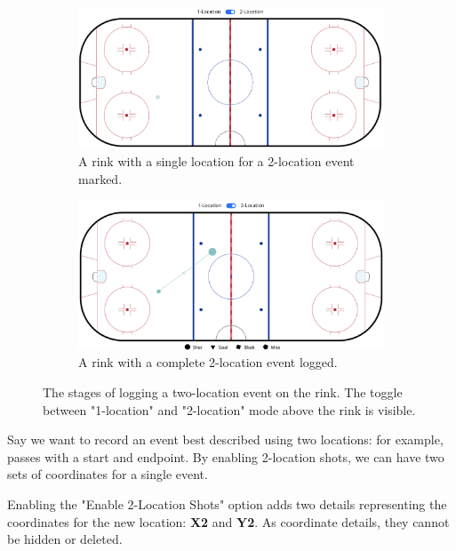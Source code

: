 \documentclass[letterpaper]{article}
\begin{document}
\begin{figure}[h]
		\begin{subfigure}{.5\textwidth}
	\centering
	\includegraphics[width=1\linewidth]{images/ghost-dot}
	\caption{A rink with a single location for a 2-location event marked.}
	\end{subfigure}
		\begin{subfigure}{.5\textwidth}
	\centering
	\includegraphics[width=1\linewidth]{images/two-location}
	\caption{A rink with a complete 2-location event logged.}
\end{subfigure}
\caption{The stages of logging a two-location event on the rink. The toggle between "1-location" and "2-location" mode above the rink is visible.}
\label{fig:two-location}
\end{figure}

Say we want to record an event best described using two locations: for example, passes with a start and endpoint. By enabling 2-location shots, we can have two sets of coordinates for a single event.

Enabling the "Enable 2-Location Shots" option adds two details representing the coordinates for the new location: \textbf{X2} and \textbf{Y2}. As coordinate details, they cannot be hidden or deleted.
\end{document}
